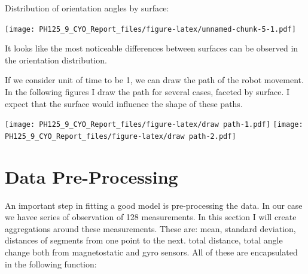 \documentclass[]{article}
\begin{document}
Distribution of orientation angles by surface:

\texttt{[image: PH125\_9\_CYO\_Report\_files/figure-latex/unnamed-chunk-5-1.pdf]}

It looks like the most noticeable differences between surfaces can be
observed in the orientation distribution.

If we consider unit of time to be 1, we can draw the path of the robot
movement. In the following figures I draw the path for several cases,
faceted by surface. I expect that the surface would influence the shape
of these paths.

\texttt{[image: PH125\_9\_CYO\_Report\_files/figure-latex/draw path-1.pdf]}
\texttt{[image: PH125\_9\_CYO\_Report\_files/figure-latex/draw path-2.pdf]}

\hypertarget{data-pre-processing}{%
\section{Data Pre-Processing}\label{data-pre-processing}}

An important step in fitting a good model is pre-processing the data. In
our case we havee series of observation of 128 measurements. In this
section I will create aggregations around these measurements. These are:
mean, standard deviation, distances of segments from one point to the
next. total distance, total angle change both from magnetostatic and
gyro sensors. All of these are encapsulated in the following function:
\end{document}
